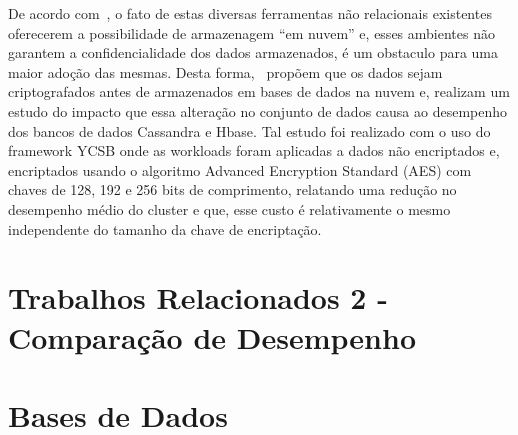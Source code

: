 \documentclass[a4paper,12pt,onecolumn,titlepage]{article}
\begin{document}
De acordo com~\cite{waage:2015}, o fato de estas diversas ferramentas não relacionais existentes oferecerem a possibilidade de armazenagem “em nuvem” e, esses ambientes não garantem a confidencialidade dos dados armazenados, é um obstaculo para uma maior adoção das mesmas. Desta forma,~\cite{waage:2015} propõem que os dados sejam criptografados antes de armazenados em bases de dados na nuvem e, realizam um estudo do impacto que essa alteração no conjunto de dados causa ao desempenho dos bancos de dados Cassandra e Hbase. Tal estudo foi realizado com o uso do framework YCSB onde as workloads foram aplicadas a dados não encriptados e, encriptados usando o algoritmo Advanced Encryption Standard (AES) com chaves de 128, 192 e 256 bits de comprimento, relatando uma redução no desempenho médio do cluster e que, esse custo é relativamente o mesmo independente do tamanho da chave de encriptação.

\section{Trabalhos Relacionados 2 - Comparação de Desempenho}
\label{sec:relacionados2}

\section{Bases de Dados}
\label{sec:bases}


\renewcommand{\refname}{Bibliografia}


\end{document}
